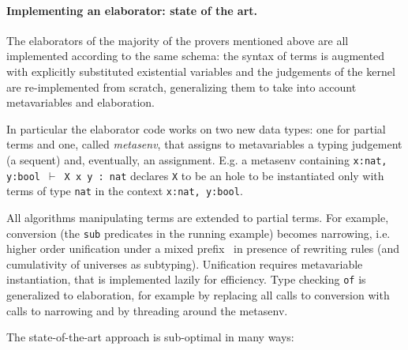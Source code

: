 \documentclass{easychair}
\begin{document}
\paragraph{Implementing an elaborator: state of the art.}  %

The elaborators of the majority of the provers mentioned above are all
implemented according to the same schema: the syntax of terms is augmented with
explicitly substituted existential variables
and the judgements of the kernel are re-implemented from scratch, generalizing
them to take into account metavariables and elaboration.

In particular the elaborator code works on two new data types: one for partial terms and one, called \emph{metasenv}, that assigns to metavariables a typing judgement (a sequent) and, eventually, an assignment. E.g. a metasenv containing \verb+x:nat, y:bool +$\vdash$\verb+ X x y : nat+ declares \verb+X+ to be an hole to be instantiated only with terms of type \verb+nat+ in the context \verb+x:nat, y:bool+.

All algorithms manipulating terms are extended to partial
terms. For example, conversion (the \verb+sub+ predicates in the running
example) becomes narrowing, i.e. higher order unification under a
mixed prefix~\cite{mixedprefix} in presence of rewriting rules (and cumulativity of universes as subtyping).
Unification requires metavariable instantiation, that is
implemented lazily for efficiency.  Type checking \verb+of+ is generalized to
elaboration, for example by replacing all calls to conversion with calls to
narrowing and by threading around the metasenv.

The state-of-the-art approach is sub-optimal in many ways:
\end{document}

